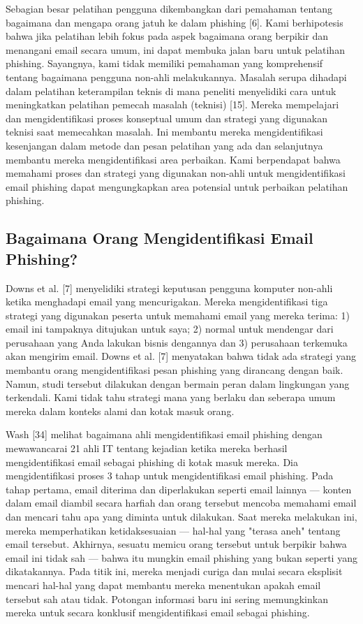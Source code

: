 \documentclass[lettersize,journal]{IEEEtran}
\begin{document}
Sebagian besar pelatihan pengguna dikembangkan dari pemahaman tentang bagaimana
dan mengapa orang jatuh ke dalam phishing [6]. Kami berhipotesis bahwa jika
pelatihan lebih fokus pada aspek bagaimana orang berpikir dan menangani email 
secara umum, ini dapat membuka jalan baru untuk pelatihan
phishing. Sayangnya, kami tidak memiliki pemahaman yang komprehensif tentang
bagaimana pengguna non-ahli melakukannya. Masalah serupa dihadapi dalam
pelatihan keterampilan teknis di mana peneliti menyelidiki cara untuk
meningkatkan pelatihan pemecah masalah (teknisi) [15]. Mereka mempelajari dan
mengidentifikasi proses konseptual umum dan strategi yang digunakan teknisi
saat memecahkan masalah. Ini membantu mereka mengidentifikasi kesenjangan dalam
metode dan pesan pelatihan yang ada dan selanjutnya membantu mereka
mengidentifikasi area perbaikan. Kami berpendapat bahwa memahami proses dan
strategi yang digunakan non-ahli untuk mengidentifikasi email phishing dapat
mengungkapkan area potensial untuk perbaikan pelatihan phishing.

\subsection{Bagaimana Orang Mengidentifikasi Email Phishing?}

Downs et al. [7] menyelidiki strategi keputusan pengguna komputer non-ahli
ketika menghadapi email yang mencurigakan. Mereka mengidentifikasi tiga
strategi yang digunakan peserta untuk memahami email yang mereka terima: 1)
email ini tampaknya ditujukan untuk saya; 2) normal untuk mendengar dari
perusahaan yang Anda lakukan bisnis dengannya dan 3) perusahaan terkemuka akan
mengirim email. Downs et al. [7] menyatakan bahwa tidak ada strategi yang
membantu orang mengidentifikasi pesan phishing yang dirancang dengan baik.
Namun, studi tersebut dilakukan dengan bermain peran dalam lingkungan yang
terkendali. Kami tidak tahu strategi mana yang berlaku dan seberapa umum mereka
dalam konteks alami dan kotak masuk orang.

Wash [34] melihat bagaimana ahli mengidentifikasi email phishing dengan
mewawancarai 21 ahli IT tentang kejadian ketika mereka berhasil
mengidentifikasi email sebagai phishing di kotak masuk mereka. Dia
mengidentifikasi proses 3 tahap untuk mengidentifikasi email phishing. Pada
tahap pertama, email diterima dan diperlakukan seperti email lainnya — konten
dalam email diambil secara harfiah dan orang tersebut mencoba memahami email
dan mencari tahu apa yang diminta untuk dilakukan. Saat mereka melakukan ini,
mereka memperhatikan ketidaksesuaian — hal-hal yang "terasa aneh" tentang email
tersebut. Akhirnya, sesuatu memicu orang tersebut untuk berpikir bahwa email
ini tidak sah — bahwa itu mungkin email phishing yang bukan seperti yang
dikatakannya. Pada titik ini, mereka menjadi curiga dan mulai secara eksplisit
mencari hal-hal yang dapat membantu mereka menentukan apakah email tersebut sah
atau tidak. Potongan informasi baru ini sering memungkinkan mereka untuk secara
konklusif mengidentifikasi email sebagai phishing.
\end{document}
